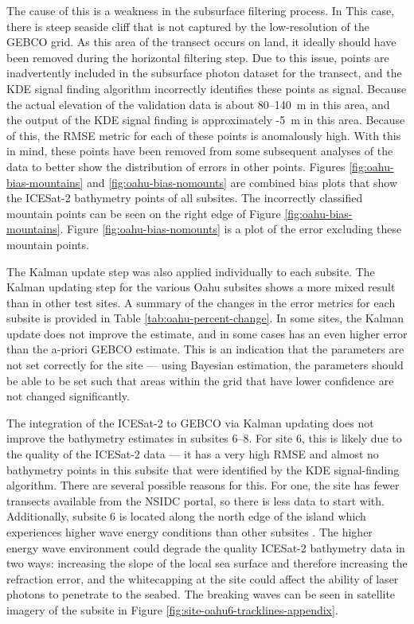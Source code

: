 The cause of this is a weakness in the subsurface filtering process. In This case, there is steep seaside cliff that is not captured by the low-resolution of the GEBCO grid. As this area of the transect occurs on land, it ideally should have been removed during the horizontal filtering step. Due to this issue, points are inadvertently included in the subsurface photon dataset for the transect, and the KDE signal finding algorithm incorrectly identifies these points as signal. Because the actual elevation of the validation data is about 80--140~m in this area, and the output of the KDE signal finding is approximately -5~m in this area. Because of this, the RMSE metric for each of these points is anomalously high. With this in mind, these points have been removed from some subsequent analyses of the data to better show the distribution of errors in other points. Figures \ref{fig:oahu-bias-mountains} and \ref{fig:oahu-bias-nomounts} are combined bias plots that show the ICESat-2 bathymetry points of all subsites. The incorrectly classified mountain points can be seen on the right edge of Figure \ref{fig:oahu-bias-mountains}. Figure \ref{fig:oahu-bias-nomounts} is a plot of the error excluding these mountain points.

The Kalman update step was also applied individually to each subsite. The Kalman updating step for the various Oahu subsites shows a more mixed result than in other test sites. A summary of the changes in the error metrics for each subsite is provided in Table \ref{tab:oahu-percent-change}. In some sites, the Kalman update does not improve the estimate, and in some cases has an even higher error than the a-priori GEBCO estimate. This is an indication that the parameters are not set correctly for the site --- using Bayesian estimation, the parameters should be able to be set such that areas within the grid that have lower confidence are not changed significantly.

The integration of the ICESat-2 to GEBCO via Kalman updating does not improve the bathymetry estimates in subsites 6--8. For site 6, this is likely due to the quality of the ICESat-2 data --- it has a very high RMSE and almost no bathymetry points in this subsite that were identified by the KDE signal-finding algorithm. There are several possible reasons for this. For one, the site has fewer transects available from the NSIDC portal, so there is less data to start with. Additionally, subsite 6 is located along the north edge of the island which experiences higher wave energy conditions than other subsites \parencite{Vitousek2008a}. The higher energy wave environment could degrade the quality ICESat-2 bathymetry data in two ways: increasing the slope of the local sea surface and therefore increasing the refraction error, and the whitecapping at the site could affect the ability of laser photons to penetrate to the seabed. The breaking waves can be seen in satellite imagery of the subsite in Figure \ref{fig:site-oahu6-tracklines-appendix}.

